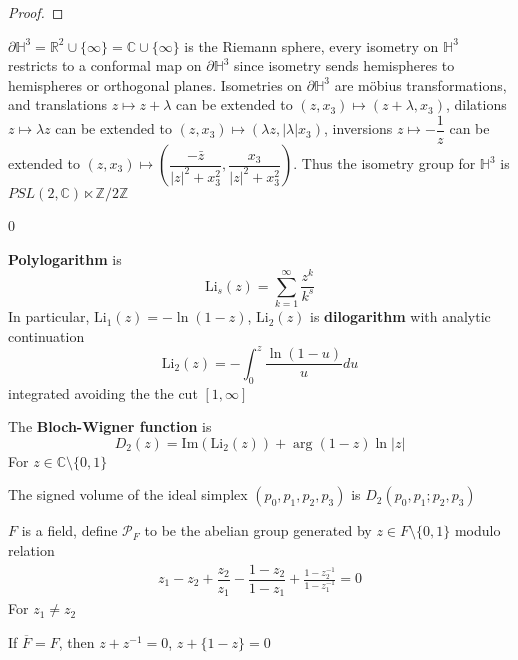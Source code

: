 \documentclass[../main.tex]{subfiles}
\def\CROP{1}
\begin{document}
\begin{proof}

\end{proof}
\fi

\begin{example}
$\partial\mathbb H^3=\mathbb R^2\cup\{\infty\}=\mathbb C\cup\{\infty\}$ is the Riemann sphere, every isometry on $\mathbb H^3$ restricts to a conformal map on $\partial\mathbb H^3$ since isometry sends hemispheres to hemispheres or orthogonal planes. Isometries on $\partial\mathbb H^3$ are m\"obius transformations, and translations $z\mapsto z+\lambda$ can be extended to $(z,x_3)\mapsto(z+\lambda,x_3)$, dilations $z\mapsto\lambda z$ can be extended to $(z,x_3)\mapsto (\lambda z,|\lambda|x_3)$, inversions $z\mapsto -\dfrac{1}{z}$ can be extended to $(z,x_3)\mapsto\left(\dfrac{-\bar z}{|z|^2+x_3^2},\dfrac{x_3}{|z|^2+x_3^2}\right)$. Thus the isometry group for $\mathbb H^3$ is $PSL(2,\mathbb C)\ltimes\mathbb Z/2\mathbb Z$
\end{example}

\if\CROP0
\begin{definition}
\textbf{Polylogarithm} is 
\[\displaystyle\mathrm{Li}_s(z)=\sum_{k=1}^\infty\dfrac{z^k}{k^s}\]
In particular, $\mathrm{Li}_1(z)=-\ln(1-z)$, $\mathrm{Li}_2(z)$ is \textbf{dilogarithm} with analytic continuation
\[\displaystyle\mathrm{Li}_2(z)=-\int_{0}^z\frac{\ln(1-u)}{u}du\]
integrated avoiding the the cut $[1,\infty]$ \par
The \textbf{Bloch-Wigner function} is
\[D_2(z)=\mathrm{Im}(\mathrm{Li}_2(z))+\arg(1-z)\ln|z|\]
For $z\in\mathbb C\setminus\{0,1\}$
\end{definition}

\begin{lemma}
The signed volume of the ideal simplex $(p_0,p_1,p_2,p_3)$ is $D_2(p_0,p_1;p_2,p_3)$
\end{lemma}
\fi

\begin{definition}\label{Definition for P_F}
$F$ is a field, define $\mathcal P_F$ to be the abelian group generated by $z\in F\setminus\{0,1\}$ modulo relation
\begin{align}\label{Relation for PF}
z_1-z_2+\dfrac{z_2}{z_1}-\dfrac{1-z_2}{1-z_1}+\frac{1-z_2^{-1}}{1-z_1^{-1}}=0
\end{align}
For $z_1\neq z_2$
\end{definition}

\begin{lemma}
If $\overline F=F$, then $z+z^{-1}=0$, $z+\{1-z\}=0$
\end{lemma}
\end{document}

